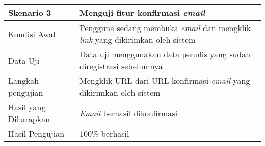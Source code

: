 \begin{longtable}{|X|X|}
		
	\textbf{Skenario 3}
		& Menguji fitur konfirmasi \textit{email} \\ \hline
	Kondisi Awal
		& Pengguna sedang membuka \textit{email} dan mengklik \textit{link} yang dikirimkan oleh sistem \\ \hline
	Data Uji
		& Data uji menggunakan data penulis yang sudah diregistrasi sebelumnya \\ \hline
	Langkah pengujian &
		Mengklik URL dari URL konfirmasi \textit{email} yang dikirimkan oleh sistem \\ \hline
	Hasil yang Diharapkan
		& \textit{Email} berhasil dikonfirmasi \\ \hline
	Hasil Pengujian
		& 100\% berhasil \\ \hline	
\end{longtable}